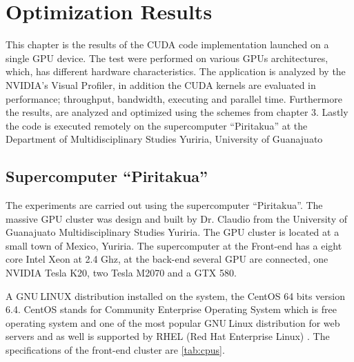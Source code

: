 
\chapter{Optimization Results} %

\label{Optimization Results} %



This chapter is the results of the CUDA code implementation launched on a single GPU device. The test were performed on various GPUs architectures, which, has different hardware characteristics. The application is analyzed by the NVIDIA's Visual Profiler, in addition the CUDA kernels are evaluated in performance; throughput, bandwidth, executing and parallel time. Furthermore the results, are analyzed and optimized using the schemes from chapter 3. Lastly the code is executed remotely on the supercomputer ``Piritakua'' at the Department of Multidisciplinary Studies Yuriria, University of Guanajuato

\section{Supercomputer ``Piritakua''}

The experiments are carried out using the supercomputer “Piritakua”. The massive GPU cluster was design and built by Dr. Claudio from the University of Guanajuato Multidisciplinary Studies Yuriria. The GPU cluster is located at a small town of Mexico, Yuriria. The supercomputer at the Front-end has a eight core Intel Xeon at 2.4 Ghz, at the back-end several GPU are connected, one NVIDIA Tesla K20, two Tesla M2070 and a GTX 580.

A GNU$ \ $LINUX distribution installed on the system, the CentOS 64 bits version 6.4. CentOS stands for Community Enterprise Operating System which is free operating system and one of the most popular GNU$ \ $Linux distribution for web servers and as well is supported by RHEL (Red Hat Enterprise Linux) \cite{centos}.  The specifications of the front-end cluster are \ref{tab:cpus}.

